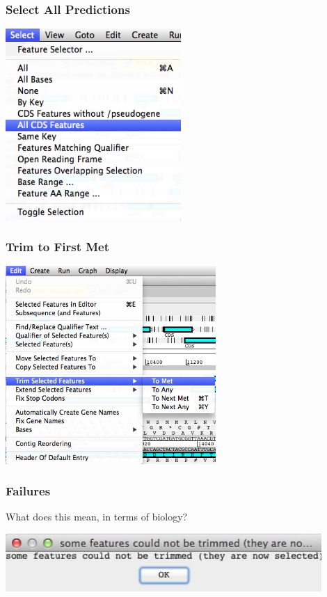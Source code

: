 \begin{frame}
  \frametitle{Select All Predictions}    
  \begin{center}
    \includegraphics[width=0.5\textwidth]{images/artemis_orf7}     
  \end{center}
\end{frame}

\begin{frame}
  \frametitle{Trim to First Met}    
  \begin{center}
    \includegraphics[width=0.6\textwidth]{images/artemis_orf8}     
  \end{center}
\end{frame}

\begin{frame}
  \frametitle{Failures}
  What does this mean, in terms of biology?
  \begin{center}
    \includegraphics[width=0.9\textwidth]{images/artemis_orf9}     
  \end{center}
\end{frame}

